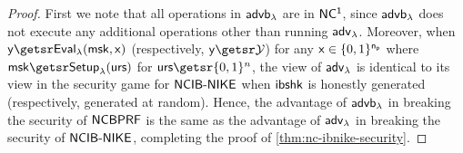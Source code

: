 \begin{proof}
	First we note that all operations in $\mathsf{advb}_{\lambda}$ are in $\mathsf{NC^1}$, since $\mathsf{advb}_{\lambda}$ does not execute any additional operations other than running ${\mathsf{adv}}_\lambda$.
	Moreover, when $\image \getsr \bprfeval(\bprfmsk, \preimage)$ (respectively, $\image \getsr \bprfy$) for any $\mathsf{x} \in \{0, 1\}^{\mathsf{n_p}}$ where $\bprfmsk \getsr \bprfsetup(\urs)$ for $\urs \getsr \bin^{n}$, the view of ${\mathsf{adv}}_\lambda$ is identical to its view in the security game for $\mathsf{NCIB\text{-}NIKE}$ when $\mathsf{ibshk}$ is honestly generated (respectively, generated at random). Hence, the advantage of $\mathsf{advb}_{\lambda}$ in breaking the security of $\mathsf{NCBPRF}$ is the same as the advantage of ${\mathsf{adv}}_\lambda$ in breaking the security of $\mathsf{NCIB\text{-}NIKE}$, completing the proof of \cref{thm:nc-ibnike-security}.

\end{proof}
